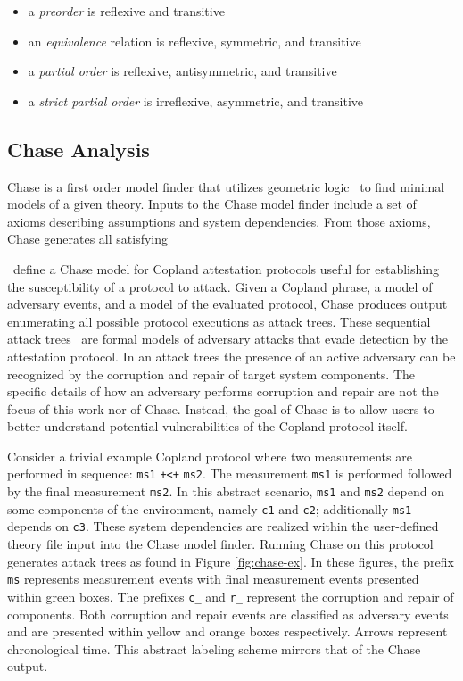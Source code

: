 \documentclass[runningheads]{llncs}
\theoremstyle{definition}
\newcommand{\squash}{\itemsep=0pt\parskip=0pt}
\begin{document}
\begin{itemize}
  \squash
\item a \emph{preorder} is reflexive and transitive
\item an \emph{equivalence} relation is reflexive, symmetric, and transitive 
\item a \emph{partial order} is reflexive, antisymmetric, and transitive 
\item a \emph{strict partial order} is irreflexive, asymmetric, and transitive 
\end{itemize}

\subsection*{Chase Analysis}

Chase \cite{Ramsdell:2020:Chase,Rowe:2021:AutomatedTrust} is a first
order model finder that utilizes geometric
logic~\citep{Enderton:logic} to find minimal models of a given
theory. Inputs to the Chase model finder include a set of axioms
describing assumptions and system dependencies. From those axioms,
Chase generates all satisfying


\citet{Rowe:2021:AutomatedTrust}~define a Chase model for Copland
attestation protocols useful for establishing the susceptibility of a
protocol to attack. Given a Copland phrase, a model of adversary
events, and a model of the evaluated protocol, Chase produces output
enumerating all possible protocol executions as attack trees. These
sequential attack trees~\citep{Horne:Attack, Jhaware:attack} are
formal models of adversary attacks that evade detection by the
attestation protocol.  In an attack trees the presence of an active
adversary can be recognized by the corruption and repair of target
system components. The specific details of how an adversary performs
corruption and repair are not the focus of this work nor of
Chase. Instead, the goal of Chase is to allow users to better
understand potential vulnerabilities of the Copland
protocol itself.

Consider a trivial example Copland protocol where two measurements are
performed in sequence: \texttt{ms1} \texttt{+<+} \texttt{ms2}.
The measurement \texttt{ms1} is performed followed by the
final measurement \texttt{ms2}. In this abstract scenario, \texttt{ms1} and
\texttt{ms2} depend on some components of the environment, namely
\texttt{c1} and \texttt{c2}; additionally \texttt{ms1} depends on
\texttt{c3}. These system dependencies are realized within the
user-defined theory file input into the Chase model finder. Running
Chase on this protocol generates attack trees as found in Figure
\ref{fig:chase-ex}. In these figures, the prefix \texttt{ms}
represents measurement events with final measurement events presented
within green boxes. The prefixes \texttt{c\_} and  \texttt{r\_} 
represent the corruption and repair of components. Both
corruption and repair events are classified as adversary events and
are presented within yellow and orange boxes respectively. Arrows 
represent chronological time. This abstract labeling scheme mirrors that of the Chase output.
\end{document}
